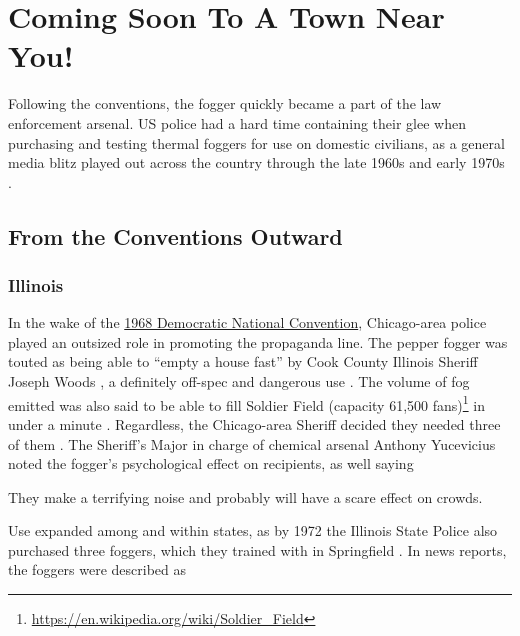 \documentclass[
  11pt,
]{krantz}
\renewenvironment{quote}{\begin{VF}}{\end{VF}}
\renewcommand{\href}[2]{#2\footnote{\url{#1}}}
\begin{document}
\hypertarget{coming-soon-to-a-town-near-you}{%
\chapter*{Coming Soon To A Town Near You!}\label{coming-soon-to-a-town-near-you}}


Following the conventions, the fogger quickly became a part of the law enforcement arsenal.
US police had a hard time containing their glee when purchasing and testing thermal foggers for use on domestic civilians, as a general media blitz played out across the country through the late 1960s and early 1970s \citep{PlainDealer1971}.

\hypertarget{from-the-conventions-outward}{%
\section*{From the Conventions Outward}\label{from-the-conventions-outward}}


\hypertarget{illinois}{%
\subsection*{Illinois}\label{illinois}}


In the wake of the \protect\hyperlink{ChicagoIL1968_08_26}{1968 Democratic National Convention}, Chicago-area police played an outsized role in promoting the propaganda line.
The pepper fogger was touted as being able to ``empty a house fast'' by Cook County Illinois Sheriff Joseph Woods \citep{MtVernonRegisterNews1969_04_09, DailyDispatch1969_04_09}, a definitely off-spec and dangerous use \citep{Nixalite2009b}.
The volume of fog emitted was also said to be able to fill \href{https://en.wikipedia.org/wiki/Soldier_Field}{Soldier Field (capacity 61,500 fans)} in under a minute \citep{DailyDispatch1969_04_09}.
Regardless, the Chicago-area Sheriff decided they needed three of them \citep{DailyDispatch1969_04_09}.
The Sheriff's Major in charge of chemical arsenal Anthony Yucevicius noted the fogger's psychological effect on recipients, as well saying

\begin{quote}
They make a terrifying noise and probably will have a scare effect on crowds.

\end{quote}

Use expanded among and within states, as by 1972 the Illinois State Police also purchased three foggers, which they trained with in Springfield \citep{Robinson1972}.
In news reports, the foggers were described as
\end{document}
